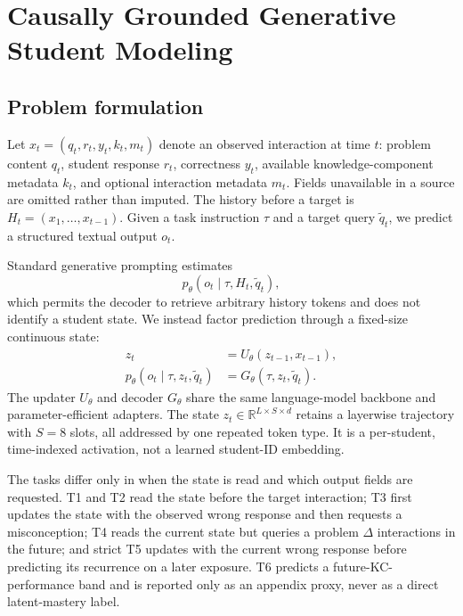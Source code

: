 \section{Causally Grounded Generative Student Modeling}
\label{sec:method}

\subsection{Problem formulation}

Let $x_t=(q_t,r_t,y_t,k_t,m_t)$ denote an observed interaction at time $t$:
problem content $q_t$, student response $r_t$, correctness $y_t$, available
knowledge-component metadata $k_t$, and optional interaction metadata $m_t$.
Fields unavailable in a source are omitted rather than imputed.  The history
before a target is $H_t=(x_1,\ldots,x_{t-1})$.  Given a task instruction
$\tau$ and a target query $\tilde q_t$, we predict a structured textual output
$o_t$.

Standard generative prompting estimates
\begin{equation}
    p_\theta(o_t\mid \tau,H_t,\tilde q_t),
    \label{eq:full-context}
\end{equation}
which permits the decoder to retrieve arbitrary history tokens and does not
identify a student state.  We instead factor prediction through a fixed-size
continuous state:
\begin{align}
    z_t &= U_\theta(z_{t-1},x_{t-1}),
    \label{eq:update}\\
    p_\theta(o_t\mid \tau,z_t,\tilde q_t)
        &= G_\theta(\tau,z_t,\tilde q_t).
    \label{eq:decode}
\end{align}
The updater $U_\theta$ and decoder $G_\theta$ share the same language-model
backbone and parameter-efficient adapters.  The state
$z_t\in\mathbb{R}^{L\times S\times d}$ retains a layerwise trajectory with
$S=8$ slots, all addressed by one repeated \studentstate{} token type.  It is a
per-student, time-indexed activation, not a learned student-ID embedding.

The tasks differ only in when the state is read and which output fields are
requested.  T1 and T2 read the state before the target interaction; T3 first
updates the state with the observed wrong response and then requests a
misconception; T4 reads the current state but queries a problem $\Delta$
interactions in the future; and strict T5 updates with the current wrong
response before predicting its recurrence on a later exposure.  T6 predicts a
future-KC-performance band and is reported only as an appendix proxy, never as
a direct latent-mastery label.

